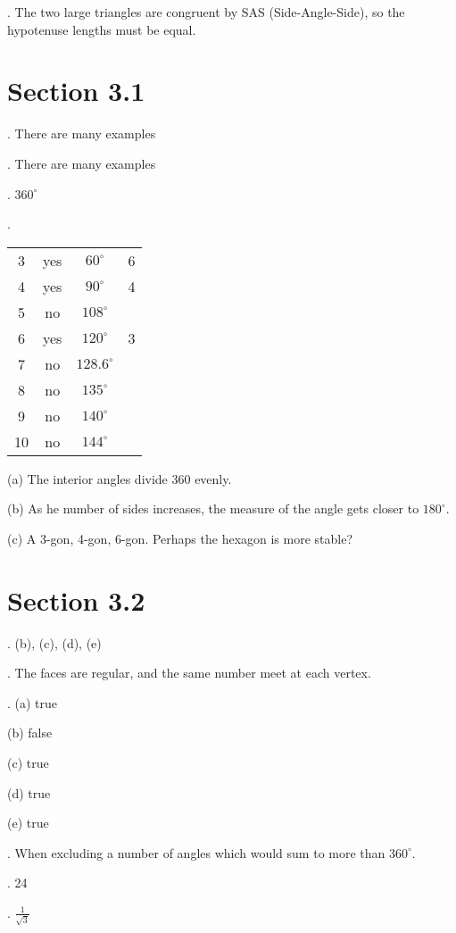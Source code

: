 .  The two large triangles are congruent by SAS (Side-Angle-Side), so the hypotenuse lengths must be equal.


\section*{Section 3.1}

.  There are many examples

.  There are many examples

.  $360^\circ$

.

 \begin{tabular}{c|c|c|c}
	3 & yes & $60^\circ$ & 6 \\
	4 & yes & $90^\circ$ & 4\\
	5& no & $108^\circ$ & \\
	6 & yes & $120^\circ$ & 3 \\
	7 & no &$ 128.6^\circ$ & \\
	8 & no & $135^\circ$ & \\
	9 & no &$ 140^\circ$ & \\
	10 & no & $144^\circ$ & \\
\end{tabular}

(a) The interior angles divide 360 evenly.

(b) As he number of sides increases, the measure of the angle gets closer to $180^\circ$.

(c) A 3-gon, 4-gon, 6-gon.  Perhaps the hexagon is more stable?

\section*{Section 3.2}

. (b), (c), (d), (e)

.  The faces are regular, and the same number meet at each vertex.

. (a) true

(b) false

(c) true

(d)  true

(e) true

.  When excluding a number of angles which would sum to more than $360^\circ$.

.  24

.  $\frac{1}{\sqrt{3}}$

